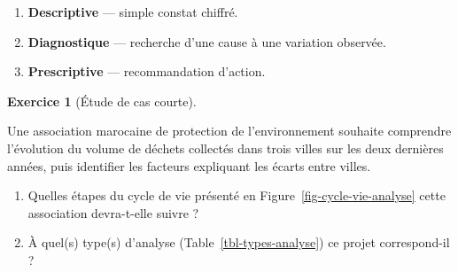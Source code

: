 \documentclass[
  french,
  letterpaper,
  open=any]{scrbook}
\providecommand{\tightlist}{%
  \setlength{\itemsep}{0pt}\setlength{\parskip}{0pt}}
\theoremstyle{definition}
\theoremstyle{definition}
\newtheorem{exercise}{Exercice}[section]
\theoremstyle{remark}
\begin{document}
\begin{tcolorbox}[enhanced jigsaw, arc=.35mm, bottomrule=.15mm, bottomtitle=1mm, breakable, colback=white, colbacktitle=quarto-callout-tip-color!10!white, colframe=quarto-callout-tip-color-frame, coltitle=black, left=2mm, leftrule=.75mm, opacityback=0, opacitybacktitle=0.6, rightrule=.15mm, title=\textcolor{quarto-callout-tip-color}{\faLightbulb}\hspace{0.5em}{Solution de l'exercice Exercice~\ref{exr-intro-ad-2}}, titlerule=0mm, toprule=.15mm, toptitle=1mm]

\begin{enumerate}
\def\labelenumi{\alph{enumi}.}
\tightlist
\item
  \textbf{Descriptive} --- simple constat chiffré.
\item
  \textbf{Diagnostique} --- recherche d'une cause à une variation
  observée.
\item
  \textbf{Prescriptive} --- recommandation d'action.
\end{enumerate}

\end{tcolorbox}

\begin{exercise}[Étude de cas
courte]\protect\hypertarget{exr-intro-ad-3}{}\label{exr-intro-ad-3}

Une association marocaine de protection de l'environnement souhaite
comprendre l'évolution du volume de déchets collectés dans trois villes
sur les deux dernières années, puis identifier les facteurs expliquant
les écarts entre villes.

\begin{enumerate}
\def\labelenumi{\alph{enumi}.}
\tightlist
\item
  Quelles étapes du cycle de vie présenté en
  Figure~\ref{fig-cycle-vie-analyse} cette association devra-t-elle
  suivre ?
\item
  À quel(s) type(s) d'analyse (Table~\ref{tbl-types-analyse}) ce projet
  correspond-il ?
\end{enumerate}

\end{exercise}
\end{document}
